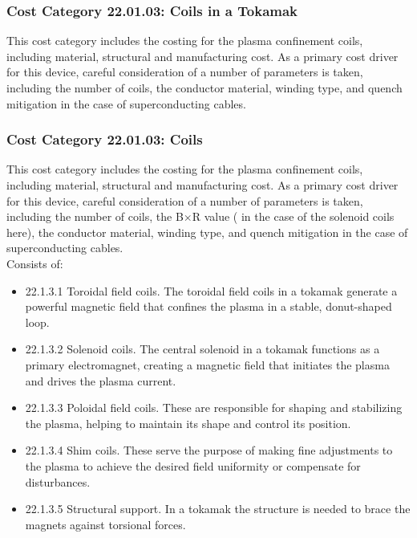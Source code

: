 \subsubsection*{Cost Category 22.01.03: Coils in a Tokamak}

This cost category includes the costing for the plasma confinement coils, including  material, structural and manufacturing cost. As a primary cost driver for this device, careful consideration of a number of parameters is taken, including the number of coils, the conductor material, winding type, and quench mitigation in the case of superconducting cables.\\

\subsubsection*{Cost Category 22.01.03: Coils}

This cost category includes the costing for the plasma confinement coils, including  material, structural and manufacturing cost. As a primary cost driver for this device, careful consideration of a number of parameters is taken, including the number of coils, the B$\times$R value ( in the case of the solenoid coils here), the conductor material, winding type, and quench mitigation in the case of superconducting cables.\\

Consists of:

\begin{itemize}
    \item 22.1.3.1 Toroidal field coils. The toroidal field coils in a tokamak generate a powerful magnetic field that confines the plasma in a stable, donut-shaped loop.
    \item 22.1.3.2 Solenoid coils. The central solenoid in a tokamak functions as a primary electromagnet, creating a magnetic field that initiates the plasma and drives the plasma current.
    \item 22.1.3.3 Poloidal field coils. These are responsible for shaping and stabilizing the plasma, helping to maintain its shape and control its position.
    \item 22.1.3.4 Shim coils. These serve the purpose of making fine adjustments to the plasma to achieve the desired field uniformity or compensate for disturbances.
    \item 22.1.3.5 Structural support. In a tokamak the structure is needed to brace the magnets against torsional forces.
\end{itemize}
   

